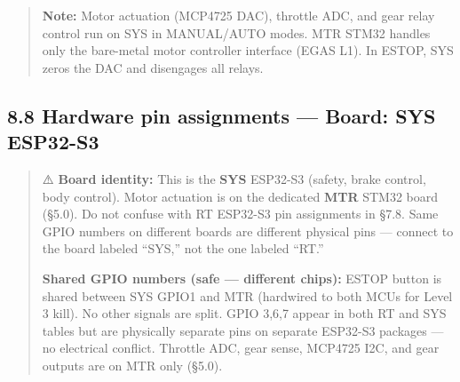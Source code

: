 \documentclass[12pt,a4paper,oneside]{report}
\begin{document}
\begin{quote}
\textbf{Note:} Motor actuation (MCP4725 DAC), throttle ADC, and gear relay
control run on SYS in MANUAL/AUTO modes. MTR STM32 handles only the bare-metal
motor controller interface (EGAS L1). In ESTOP, SYS zeros the DAC and disengages
all relays.
\end{quote}

\subsection{8.8 Hardware pin assignments --- Board: SYS
ESP32-S3}\label{hardware-pin-assignments-board-sys-esp32-s3}

\begin{quote}
⚠️ \textbf{Board identity:} This is the \textbf{SYS} ESP32-S3 (safety, brake
control, body control). Motor actuation is on the dedicated \textbf{MTR} STM32
board (§5.0). Do not confuse with RT ESP32-S3 pin assignments in §7.8. Same GPIO
numbers on different boards are different physical pins --- connect to the board
labeled ``SYS,'' not the one labeled ``RT.''

\textbf{Shared GPIO numbers (safe --- different chips):} ESTOP button is shared
between SYS GPIO1 and MTR (hardwired to both MCUs for Level 3 kill). No other
signals are split. GPIO 3,6,7 appear in both RT and SYS tables but are
physically separate pins on separate ESP32-S3 packages --- no electrical
conflict. Throttle ADC, gear sense, MCP4725 I2C, and gear outputs are on MTR
only (§5.0).
\end{quote}
\end{document}
